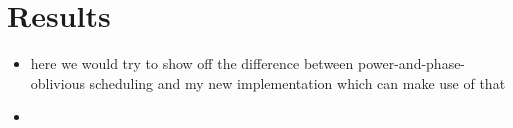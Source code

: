 \chapter{Results}

\begin{itemize}
    \item here we would try to show off the difference between power-and-phase-oblivious scheduling and my new implementation which can make use of that
    \item 
\end{itemize}